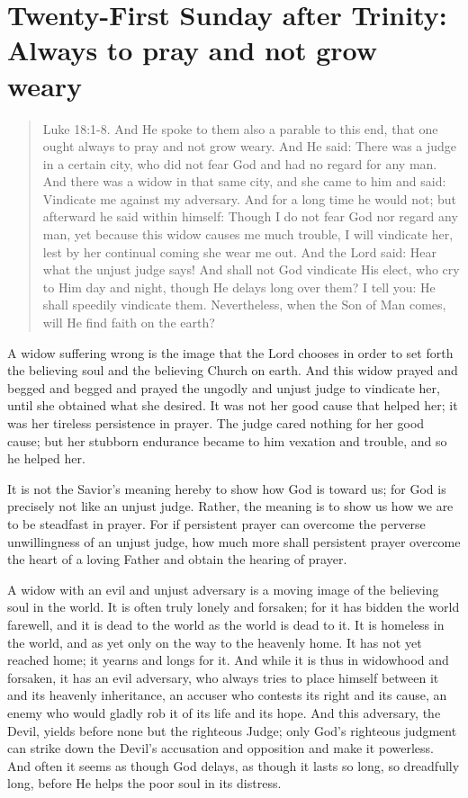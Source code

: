 
\section{Twenty-First Sunday after Trinity: Always to pray and not grow weary}

\begin{quote}

Luke 18:1-8. And He spoke to them also a parable to this end, that one ought always to pray and not grow weary. And He said: There was a judge in a certain city, who did not fear God and had no regard for any man. And there was a widow in that same city, and she came to him and said: Vindicate me against my adversary. And for a long time he would not; but afterward he said within himself: Though I do not fear God nor regard any man, yet because this widow causes me much trouble, I will vindicate her, lest by her continual coming she wear me out. And the Lord said: Hear what the unjust judge says! And shall not God vindicate His elect, who cry to Him day and night, though He delays long over them? I tell you: He shall speedily vindicate them. Nevertheless, when the Son of Man comes, will He find faith on the earth?

\end{quote}

\bigskip

A widow suffering wrong is the image that the Lord chooses in order to set forth the believing soul and the believing Church on earth. And this widow prayed and begged and begged and prayed the ungodly and unjust judge to vindicate her, until she obtained what she desired. It was not her good cause that helped her; it was her tireless persistence in prayer. The judge cared nothing for her good cause; but her stubborn endurance became to him vexation and trouble, and so he helped her.

It is not the Savior’s meaning hereby to show how God is toward us; for God is precisely not like an unjust judge. Rather, the meaning is to show us how we are to be steadfast in prayer. For if persistent prayer can overcome the perverse unwillingness of an unjust judge, how much more shall persistent prayer overcome the heart of a loving Father and obtain the hearing of prayer.

A widow with an evil and unjust adversary is a moving image of the believing soul in the world. It is often truly lonely and forsaken; for it has bidden the world farewell, and it is dead to the world as the world is dead to it. It is homeless in the world, and as yet only on the way to the heavenly home. It has not yet reached home; it yearns and longs for it. And while it is thus in widowhood and forsaken, it has an evil adversary, who always tries to place himself between it and its heavenly inheritance, an accuser who contests its right and its cause, an enemy who would gladly rob it of its life and its hope. And this adversary, the Devil, yields before none but the righteous Judge; only God’s righteous judgment can strike down the Devil’s accusation and opposition and make it powerless. And often it seems as though God delays, as though it lasts so long, so dreadfully long, before He helps the poor soul in its distress.

